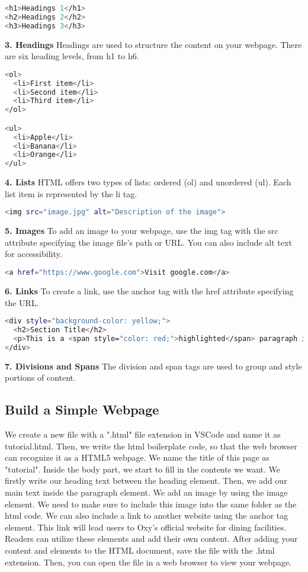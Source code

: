 \documentclass[10pt,twocolumn]{article}
\begin{document}
\begin{lstlisting}[language=bash]
<h1>Headings 1</h1>
<h2>Headings 2</h2>
<h3>Headings 3</h3>
\end{lstlisting}
\textbf{3. Headings} Headings are used to structure the content on your webpage. There are six heading levels, from h1 to h6.

\begin{lstlisting}[language=bash]
<ol>
  <li>First item</li>
  <li>Second item</li>
  <li>Third item</li>
</ol>

<ul>
  <li>Apple</li>
  <li>Banana</li>
  <li>Orange</li>
</ul>
\end{lstlisting}
\textbf{4. Lists} HTML offers two types of lists: ordered (ol) and unordered (ul). Each list item is represented by the li tag.

\begin{lstlisting}[language=bash]
<img src="image.jpg" alt="Description of the image">
\end{lstlisting}
\textbf{5. Images} To add an image to your webpage, use the img tag with the src attribute specifying the image file's path or URL. You can also include alt text for accessibility.

\begin{lstlisting}[language=bash]
<a href="https://www.google.com">Visit google.com</a>
\end{lstlisting}
\textbf{6. Links} To create a link, use the anchor tag with the href attribute specifying the URL.

\begin{lstlisting}[language=bash]
<div style="background-color: yellow;">
  <h2>Section Title</h2>
  <p>This is a <span style="color: red;">highlighted</span> paragraph inside a division.</p>
</div>
\end{lstlisting}
\textbf{7. Divisions and Spans} The division and span tags are used to group and style portions of content. 



\subsection{Build a Simple Webpage}
We create a new file with a ".html" file extension in VSCode and name it as tutorial.html. Then, we write the html boilerplate code, so that the web browser can recognize it as a HTML5 webpage. We name the title of this page as "tutorial". Inside the body part, we start to fill in the contents we want. We firstly write our heading text between the heading element. Then, we add our main text inside the paragraph element. We add an image by using the image element. We need to make sure to include this image into the same folder as the html code. We can also include a link to another website using the anchor tag element. This link will lead users to Oxy's official website for dining facilities. Readers can utilize these elements and add their own content. After adding your content and elements to the HTML document, save the file with the .html extension. Then, you can open the file in a web browser to view your webpage. 
\end{document}
